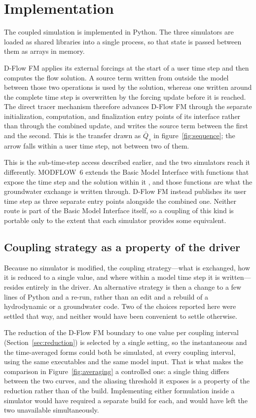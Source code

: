 \documentclass[preprint,authoryear,11pt]{elsarticle}
\begin{document}
\section{Implementation}

The coupled simulation is implemented in Python. The three simulators are loaded as shared libraries into a single process, so that state is passed between them as arrays in memory.

D-Flow FM applies its external forcings at the start of a user time step and then computes the flow solution. A source term written from outside the model between those two operations is used by the solution, whereas one written around the complete time step is overwritten by the forcing update before it is reached. The direct tracer mechanism therefore advances D-Flow FM through the separate initialization, computation, and finalization entry points of its interface rather than through the combined update, and writes the source term between the first and the second. This is the transfer drawn as $\bar{Q}_s$ in figure~\ref{fig:sequence}; the arrow falls within a user time step, not between two of them.

This is the sub-time-step access described earlier, and the two simulators reach it differently. MODFLOW~6 extends the Basic Model Interface with functions that expose the time step and the solution within it \citep{hughes2022modflowapi}, and those functions are what the groundwater exchange is written through. D-Flow FM instead publishes its user time step as three separate entry points alongside the combined one. Neither route is part of the Basic Model Interface itself, so a coupling of this kind is portable only to the extent that each simulator provides some equivalent.

\subsection{Coupling strategy as a property of the driver}

Because no simulator is modified, the coupling strategy---what is exchanged, how it is reduced to a single value, and where within a model time step it is written---resides entirely in the driver. An alternative strategy is then a change to a few lines of Python and a re-run, rather than an edit and a rebuild of a hydrodynamic or a groundwater code. Two of the choices reported here were settled that way, and neither would have been convenient to settle otherwise.

The reduction of the D-Flow FM boundary to one value per coupling interval (Section~\ref{sec:reduction}) is selected by a single setting, so the instantaneous and the time-averaged forms could both be simulated, at every coupling interval, using the same executables and the same model input. That is what makes the comparison in Figure~\ref{fig:averaging} a controlled one: a single thing differs between the two curves, and the aliasing threshold it exposes is a property of the reduction rather than of the build. Implementing either formulation inside a simulator would have required a separate build for each, and would have left the two unavailable simultaneously.
\end{document}
